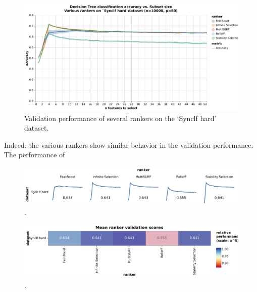 \documentclass[../main.tex]{subfiles}
\begin{document}
\begin{figure}[ht]
    \centering
    \includegraphics[width=\linewidth]{report/images/results-validation-dt-various-rankers.pdf}
    \caption{Validation performance of several rankers on the `Synclf hard' dataset.}
    \label{fig:results-validation-dt-various-rankers}
\end{figure}

Indeed, the various rankers show similar behavior in the validation performance. The performance of 


\begin{figure}[ht]
    \centering
    \includegraphics[width=\linewidth]{report/images/results-validation-with-mean-score.pdf}
    \caption{.}
    \label{fig:results-validation-with-mean-score}
\end{figure}

\begin{figure}[ht]
    \centering
    \includegraphics[width=\linewidth]{report/images/results-validation-with-mean-score-tabular.pdf}
    \caption{.}
    \label{fig:results-validation-with-mean-score-tabular}
\end{figure}
\end{document}
